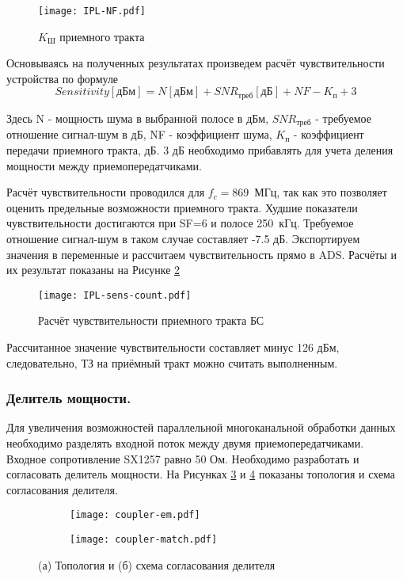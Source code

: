\begin{figure}[H]
	\centering
	\texttt{[image: IPL-NF.pdf]}
	\caption{$K_\text{Ш}$ приемного тракта}%
	\label{fig:IPL-NF}
\end{figure}

Основываясь на полученных результатах произведем расчёт чувствительности устройства по формуле
\begin{equation}
	{Sensitivity}[\text{дБм}] = N[\text{дБм}]+{SNR}_\text{треб}[\text{дБ}]+NF-K_\text{п}+3
\end{equation}

Здесь N - мощность шума в выбранной полосе в дБм, ${SNR}_\text{треб}$ - требуемое отношение сигнал-шум в дБ, NF - коэффициент шума, $K_\text{п}$ - коэффициент передачи приемного тракта, дБ. 3 дБ необходимо прибавлять для учета деления мощности между приемопередатчиками. 

Расчёт чувствительности проводился для $f_c=869$~МГц, так как это позволяет оценить предельные возможности приемного тракта. Худшие показатели чувствительности достигаются при SF=6 и полосе 250~кГц. Требуемое отношение сигнал-шум в таком случае составляет -7.5 дБ. 
Экспортируем значения в переменные и рассчитаем чувствительность прямо в ADS. Расчёты и их результат показаны на Рисунке \ref{fig:IPL-sens-count}

\begin{figure}[H]
	\centering
	\texttt{[image: IPL-sens-count.pdf]}
	\caption{Расчёт чувствительности приемного тракта БС}%
	\label{fig:IPL-sens-count}
\end{figure}

Рассчитанное значение чувствительности составляет минус 126 дБм, следовательно, ТЗ на приёмный тракт можно считать выполненным.

\subsubsection{Делитель мощности.}

Для увеличения возможностей параллельной многоканальной обработки данных необходимо разделять входной поток между двумя приемопередатчиками. Входное сопротивление SX1257 равно 50 Ом. Необходимо разработать и согласовать делитель мощности. На Рисунках \ref{fig:coupler-em} и \ref{fig:coupler-match} показаны топология и схема согласования делителя. 

\begin{figure}[H]
	\centering
	\begin{subfigure}[c]{0.49\textwidth}
		\centering
		\texttt{[image: coupler-em.pdf]}
		\caption{}%
		\label{fig:coupler-em}
	\end{subfigure}
	\hfill
	\begin{subfigure}[c]{0.49\textwidth}
		\centering
		\texttt{[image: coupler-match.pdf]}
		\caption{}%
		\label{fig:coupler-match}
	\end{subfigure}
	\caption{%
		(а) Топология и 
		(б) схема согласования делителя
	}%
	\label{fig:coupler-em-sch}
\end{figure}


